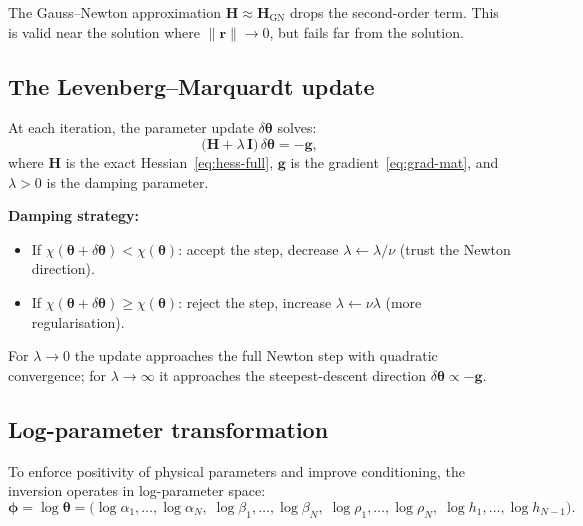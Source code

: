 \documentclass[11pt,a4paper]{article}
\theoremstyle{plain}
\theoremstyle{remark}
\begin{document}
The Gauss--Newton approximation $\mathbf{H} \approx \mathbf{H}_{\text{GN}}$
drops the second-order term.  This is valid near the solution where
$\|\mathbf{r}\| \to 0$, but fails far from the solution.

\subsection{The Levenberg--Marquardt update}\label{sec:LM}

At each iteration, the parameter update $\delta\bm{\theta}$ solves:
\begin{equation}\label{eq:LM}
  \boxed{
  \bigl(\mathbf{H} + \lambda\,\mathbf{I}\bigr)\,\delta\bm{\theta}
  = -\mathbf{g},
  }
\end{equation}
where $\mathbf{H}$ is the exact Hessian~\eqref{eq:hess-full},
$\mathbf{g}$ is the gradient~\eqref{eq:grad-mat}, and $\lambda > 0$
is the damping parameter.

\medskip\noindent
\textbf{Damping strategy:}
\begin{itemize}[nosep]
  \item If $\chi(\bm{\theta} + \delta\bm{\theta})
        < \chi(\bm{\theta})$: accept the step, decrease
        $\lambda \leftarrow \lambda/\nu$ (trust the Newton direction).
  \item If $\chi(\bm{\theta} + \delta\bm{\theta})
        \geq \chi(\bm{\theta})$: reject the step, increase
        $\lambda \leftarrow \nu\lambda$ (more regularisation).
\end{itemize}

\noindent For $\lambda \to 0$ the update approaches the full Newton step
with quadratic convergence; for $\lambda \to \infty$ it approaches the
steepest-descent direction $\delta\bm{\theta} \propto -\mathbf{g}$.

\subsection{Log-parameter transformation}\label{sec:logparams}

To enforce positivity of physical parameters and improve conditioning,
the inversion operates in log-parameter space:
\begin{equation}\label{eq:logparams}
  \bm{\phi} = \log\bm{\theta}
  = \bigl(\log\alpha_1,\dotsc,\log\alpha_N,\;
          \log\beta_1,\dotsc,\log\beta_N,\;
          \log\rho_1,\dotsc,\log\rho_N,\;
          \log h_1,\dotsc,\log h_{N-1}\bigr).
\end{equation}
\end{document}
